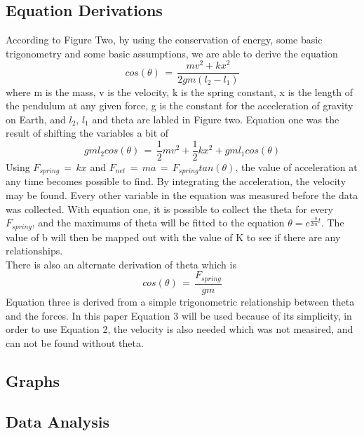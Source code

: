 \documentclass{report}
\begin{document}
\subsection*{Equation Derivations}
\indent According to Figure Two, by using the conservation of energy, some basic trigonometry and some basic assumptions, we are able to derive the equation
\begin{equation}
cos(\theta) \, = \,\frac{mv^2 + kx^2}{2gm(l_2 - l_1)}
\end{equation}
where m is the mass, v is the velocity, k is the spring constant, x is the length of the pendulum at any given force, g is the constant for the acceleration of gravity on Earth, and $l_2$, $l_1$ and theta are labled in Figure two. Equation one was the result of shifting the variables a bit of
\begin{equation}
gml_2cos(\theta) \, = \, \frac{1}{2}mv^2 + \frac{1}{2}kx^2 +gml_1cos(\theta)
\end{equation}
Using $F_{spring} \, = \, kx$ and $F_{net} \, = \, ma \, = \, F_{spring}tan(\theta)$, the value of acceleration at any time becomes possible to find. By integrating the acceleration, the velocity may be found. Every other variable in the equation was measured before the data was collected. With equation one, it is possible to collect the theta for every $F_{spring}$, and the maximums of theta will be fitted to the equation $\theta = e^{\frac{-b}{2m}t}$. The value of b will then be mapped out with the value of K to see if there are any relationships.\\
\indent There is also an alternate derivation of theta which is
\begin{equation}
cos( \theta ) \, = \, \frac{F_{spring}}{gm}
\end{equation}
Equation three is derived from a simple trigonometric relationship between theta and the forces. In this paper Equation 3 will be used because of its simplicity, in order to use Equation 2, the velocity is also needed which was not measired, and can not be found without theta.
\subsection*{Graphs}

\subsection*{Data Analysis}
\end{document}
